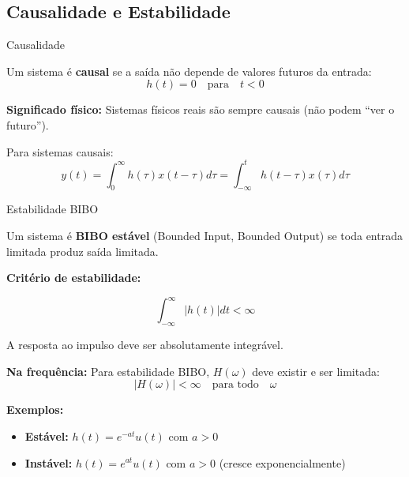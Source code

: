 
\subsection{Causalidade e Estabilidade}

\begin{frame}{Causalidade}

Um sistema é \textbf{causal} se a saída não depende de valores futuros da entrada:
\vspace{-2mm}
\[
h(t) = 0 \quad \text{para} \quad t < 0
\]
\vspace{-4mm}

\textbf{Significado físico:} Sistemas físicos reais são sempre causais (não podem ``ver o futuro'').

Para sistemas causais:
\vspace{-2mm}
\[
y(t) = \int_{0}^{\infty} h(\tau) x(t - \tau) d\tau = \int_{-\infty}^{t} h(t - \tau) x(\tau) d\tau
\]
\vspace{-4mm}

\end{frame}


\begin{frame}{Estabilidade BIBO}

Um sistema é \textbf{BIBO estável} (Bounded Input, Bounded Output) se toda entrada limitada produz saída limitada.

\textbf{Critério de estabilidade:}

\[
\int_{-\infty}^{\infty} |h(t)| dt < \infty
\]

A resposta ao impulso deve ser absolutamente integrável.

\textbf{Na frequência:} Para estabilidade BIBO, $H(\omega)$ deve existir e ser limitada:
\vspace{-2mm}
\[
|H(\omega)| < \infty \quad \text{para todo} \quad \omega
\]
\vspace{-3mm}

\textbf{Exemplos:}
\begin{itemize}
\item \textbf{Estável:} $h(t) = e^{-at}u(t)$ com $a > 0$
\item \textbf{Instável:} $h(t) = e^{at}u(t)$ com $a > 0$ (cresce exponencialmente)
\end{itemize}

\end{frame}

